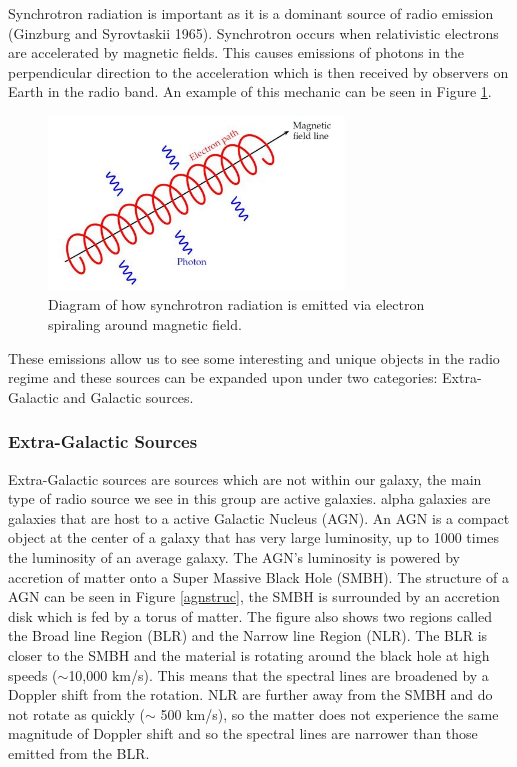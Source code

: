 \documentclass[10pt,a4paper]{article}
\begin{document}
Synchrotron radiation is important as it is a dominant source of radio emission (Ginzburg and Syrovtaskii 1965). Synchrotron occurs when relativistic electrons are accelerated by magnetic fields. This causes emissions of photons in the perpendicular direction to the acceleration which is then received by observers on Earth in the radio band. An example of this mechanic can be seen in Figure \ref{sync}.\\
\begin{figure}[H]
\begin{center}
	\includegraphics[width=0.7\textwidth]{sync}
	\caption{Diagram of how synchrotron radiation is emitted via electron spiraling around magnetic field\footnotemark. }
	\label{sync}
\end{center}
\end{figure}
These emissions allow us to see some interesting and unique objects in the radio regime and these sources can be expanded upon under two categories: Extra-Galactic and Galactic sources.


\subsubsection{Extra-Galactic Sources}
Extra-Galactic sources are sources which are not within our galaxy, the main type of radio source we see in this group are active galaxies. alpha galaxies are galaxies that are host to a active Galactic Nucleus (AGN). An AGN is a compact object at the center of a galaxy that has very large luminosity, up to 1000 times the luminosity of an average galaxy. The AGN's luminosity is powered by accretion of matter onto a Super Massive Black Hole (SMBH). The structure of a AGN can be seen in Figure \ref{agnstruc}, the SMBH is surrounded by an accretion disk which is fed by a torus of matter. The figure also shows two regions called the Broad line Region (BLR) and the Narrow line Region (NLR). The BLR is closer to the SMBH and the material is rotating around the black hole at high speeds ($\sim$10,000 km/s). This means that the spectral lines are broadened by a Doppler shift from the rotation. NLR are further away from the SMBH and do not rotate as quickly ($\sim$ 500 km/s), so the matter does not experience the same magnitude of Doppler shift and so the spectral lines are narrower than those emitted from the BLR.
\end{document}
